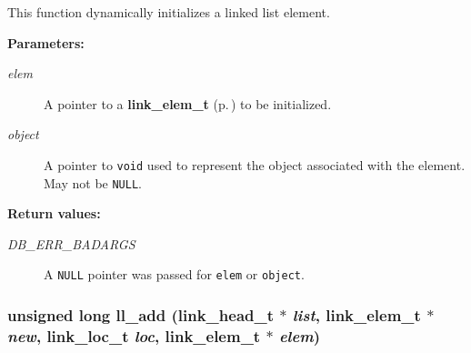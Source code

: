  This function dynamically initializes a linked list element.\begin{Desc}
\item[{\bf Parameters: }]\par
\begin{description}
\item[
{\em elem}]A pointer to a {\bf link\_\-elem\_\-t} {\rm (p.\,\pageref{group__dbprim__link_a1})} to be initialized. \item[
{\em object}]A pointer to {\tt void} used to represent the object associated with the element. May not be {\tt NULL}.\end{description}
\end{Desc}
\begin{Desc}
\item[{\bf Return values: }]\par
\begin{description}
\item[
{\em DB\_\-ERR\_\-BADARGS}]A {\tt NULL} pointer was passed for {\tt elem} or {\tt object}. \end{description}
\end{Desc}
\subsubsection{\setlength{\rightskip}{0pt plus 5cm}unsigned long ll\_\-add ({\bf link\_\-head\_\-t} $\ast$ {\em list}, {\bf link\_\-elem\_\-t} $\ast$ {\em new}, {\bf link\_\-loc\_\-t} {\em loc}, {\bf link\_\-elem\_\-t} $\ast$ {\em elem})}\label{group__dbprim__link_a6}




